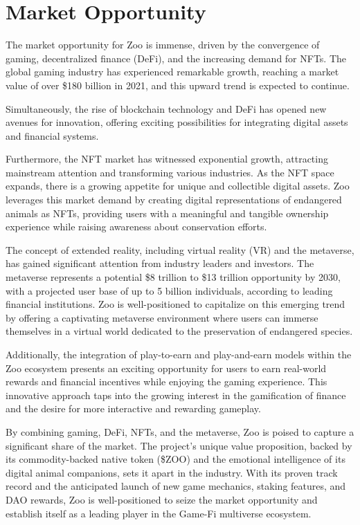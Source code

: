 \section{Market Opportunity}
\label{sec:market}

The market opportunity for Zoo is immense, driven by the convergence of gaming, decentralized finance (DeFi), and the increasing demand for NFTs. The global gaming industry has experienced remarkable growth, reaching a market value of over \$180 billion in 2021, and this upward trend is expected to continue.

Simultaneously, the rise of blockchain technology and DeFi has opened new avenues for innovation, offering exciting possibilities for integrating digital assets and financial systems.

Furthermore, the NFT market has witnessed exponential growth, attracting mainstream attention and transforming various industries. As the NFT space expands, there is a growing appetite for unique and collectible digital assets. Zoo leverages this market demand by creating digital representations of endangered animals as NFTs, providing users with a meaningful and tangible ownership experience while raising awareness about conservation efforts.

The concept of extended reality, including virtual reality (VR) and the metaverse, has gained significant attention from industry leaders and investors. The metaverse represents a potential \$8 trillion to \$13 trillion opportunity by 2030, with a projected user base of up to 5 billion individuals, according to leading financial institutions. Zoo is well-positioned to capitalize on this emerging trend by offering a captivating metaverse environment where users can immerse themselves in a virtual world dedicated to the preservation of endangered species.

Additionally, the integration of play-to-earn and play-and-earn models within the Zoo ecosystem presents an exciting opportunity for users to earn real-world rewards and financial incentives while enjoying the gaming experience. This innovative approach taps into the growing interest in the gamification of finance and the desire for more interactive and rewarding gameplay.

By combining gaming, DeFi, NFTs, and the metaverse, Zoo is poised to capture a significant share of the market. The project's unique value proposition, backed by its commodity-backed native token (\$ZOO) and the emotional intelligence of its digital animal companions, sets it apart in the industry. With its proven track record and the anticipated launch of new game mechanics, staking features, and DAO rewards, Zoo is well-positioned to seize the market opportunity and establish itself as a leading player in the Game-Fi multiverse ecosystem.
